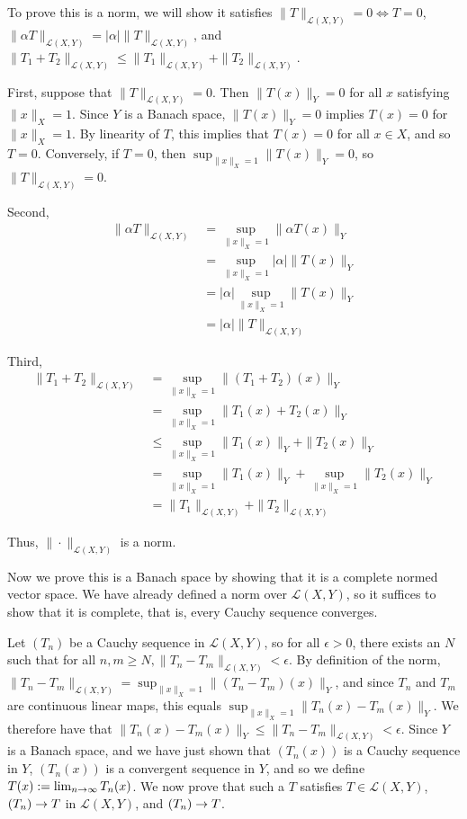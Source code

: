 \documentclass{hmwk}
\begin{document}
\begin{solution}

\pre To prove this is a norm, we will show it satisfies $\|T\|_{\mathcal{L}(X, Y)} = 0 \Leftrightarrow T = 0$, $\|\alpha T\|_{\mathcal{L}(X, Y)} = |\alpha|\|T\|_{\mathcal{L}(X, Y)}$, and $\|T_1 + T_2\|_{\mathcal{L}(X, Y)} \leq \|T_1\|_{\mathcal{L}(X, Y)} + \|T_2\|_{\mathcal{L}(X, Y)}$. 

\pre First, suppose that $\|T\|_{\mathcal{L}(X, Y)} = 0$. Then $\|T(x)\|_Y = 0$ for all $x$ satisfying $\|x\|_X = 1$. Since $Y$ is a Banach space, $\|T(x)\|_Y = 0$ implies $T(x) = 0$ for $\|x\|_X = 1$. By linearity of $T$, this implies that $T(x) = 0$ for all $x \in X$, and so $T = 0$. Conversely, if $T = 0$, then $\sup_{\|x\|_X = 1} \|T(x)\|_Y = 0$, so $\|T\|_{\mathcal{L}(X, Y)} = 0$.

\pre Second, \begin{align*}
    \|\alpha T\|_{\mathcal{L}(X, Y)} &= \sup_{\|x\|_X = 1} \|\alpha T(x)\|_Y \\
    &= \sup_{\|x\|_X = 1} |\alpha|\|T(x)\|_Y \\
    &= |\alpha| \sup_{\|x\|_X = 1} \|T(x)\|_Y \\
    &= |\alpha| \|T\|_{\mathcal{L}(X, Y)}
\end{align*}

\pre Third, \begin{align*}
    \|T_1 + T_2\|_{\mathcal{L}(X, Y)} &= \sup_{\|x\|_X = 1} \|(T_1 + T_2)(x)\|_Y \\
    &= \sup_{\|x\|_X = 1} \|T_1(x) + T_2(x)\|_Y \\
    &\leq \sup_{\|x\|_X = 1} \|T_1(x)\|_Y + \|T_2(x)\|_Y \\
    &= \sup_{\|x\|_X = 1} \|T_1(x)\|_Y + \sup_{\|x\|_X = 1} \|T_2(x)\|_Y \\
    &= \|T_1\|_{\mathcal{L}(X, Y)} + \|T_2\|_{\mathcal{L}(X, Y)}
\end{align*}

\pre Thus, $\|\cdot \|_{\mathcal{L}(X, Y)}$ is a norm. 

\pre Now we prove this is a Banach space by showing that it is a complete normed vector space. We have already defined a norm over $\mathcal{L}(X, Y)$, so it suffices to show that it is complete, that is, every Cauchy sequence converges. 

\pre Let $(T_n)$ be a Cauchy sequence in $\mathcal{L}(X, Y)$, so for all $\epsilon > 0$, there exists an $N$ such that for all $n, m \geq N, \|T_n - T_m\|_{\mathcal{L}(X, Y)} < \epsilon$. By definition of the norm, $\|T_n - T_m\|_{\mathcal{L}(X, Y)} = \sup_{\|x\|_X = 1}\|(T_n - T_m)(x)\|_Y$, and since $T_n$ and $T_m$ are continuous linear maps, this equals $\sup_{\|x\|_X = 1}\|T_n(x) - T_m(x)\|_Y$. We therefore have that $\|T_n(x) - T_m(x)\|_Y \leq \|T_n - T_m\|_{\mathcal{L}(X, Y)} < \epsilon$. Since $Y$ is a Banach space, and we have just shown that $(T_n(x))$ is a Cauchy sequence in $Y$, $(T_n(x))$ is a convergent sequence in $Y$, and so we define $T(x) := \lim_{n\rightarrow \infty} T_n(x)$. We now prove that such a $T$ satisfies $T \in \mathcal{L}(X, Y)$, $(T_n) \rightarrow T$ in $\mathcal{L}(X, Y)$, and $(T_n) \rightarrow T$.


\end{solution}
\end{document}
